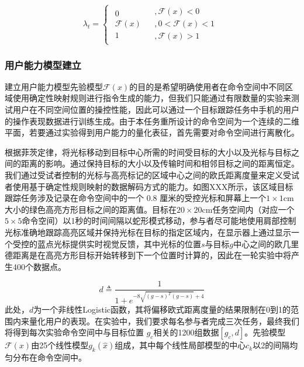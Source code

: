 \begin{equation}
    \label{ex9}
    {\lambda _t} = \left \{{\begin{array}{*{20}{c}}
        {\begin{array}{*{20}{c}}
        0  \\  
        {\mathcal{F} (x)}  \\  
        1 
      \end{array}}&{\begin{array}{*{20}{c}}
        {,\mathcal{F} (x) < 0}  \\  
        {,0 < \mathcal{F} (x) < 1}  \\  
        {,\mathcal{F} (x) > 1} 
      \end{array}} 
      \end{array}} \right.
\end{equation}     

\subsubsection{用户能力模型建立}建立用户能力模型先验模型$\mathcal{F}(x)$的目的是希望明确使用者在命令空间中不同区域使用确定性映射规则进行指令生成的能力，但我们只能通过有限数量的实验来测试用户在不同空间位置的操控性能，因此可以通过一个目标跟踪任务中手机的用户的操作表现数据进行训练生成。由于本任务重所设计的命令空间为一个连续的二维平面，若要通过实验得到用户能力的量化表征，首先需要对命令空间进行离散化。  

根据菲茨定律\cite{tangFittsLawModulated2018}，将光标移动到目标中心所需的时间受目标的大小以及光标与目标之间的距离的影响。通过保持目标的大小以及传输时间和相邻目标之间的距离恒定。我们通过受试者控制的光标与高亮标记的区域中心之间的欧氏距离度量来定义受试者使用基于确定性规则映射的数据解码方式的能力。如图XXX所示，该区域目标跟踪任务涉及记录在命令空间中的一个 0.8 厘米的受控光标和屏幕上一个$1\times1$cm大小的绿色高亮方形目标之间的距离值。目标在$20\times20$cm任务空间内（对应一个$5\times5$命令空间）以1秒的时间间隔以蛇形模式移动，参与者尽可能地使用肩部控制光标准确地跟踪高亮区域并保持光标在目标的指定区域内，在显示器上通过显示一个受控的蓝点光标提供实时视觉反馈，其中光标的位置$s$与目标$g$中心之间的欧几里德距离是在高亮方形目标开始转移到下一个位置时计算的，因此在一轮实验中将产生400个数据点。

\begin{equation}
    \label{ex12}
    d \triangleq \frac{1}{1+e^{-8\sqrt{(g-s)^T(g-s)}+4}} 
\end{equation}    
此处，$d$为一个非线性Logistic函数，其将偏移欧式距离度量的结果限制在0到1的范围内来量化用户的表现。在实验中，我们要求每名参与者完成三次任务，最终我们将得到每次实验命令空间中与目标位置   $g_c$相关的1200组数据$[g_c,d]$。先验模型$\mathcal{F}(x)$由25个线性模型$g_k(\hat x)$组成，其中每个线性局部模型的中心$c_k$以2的间隔均匀分布在命令空间中。

